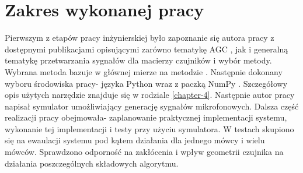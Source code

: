 \section{Zakres wykonanej pracy}
Pierwszym z etapów pracy inżynierskiej było zapoznanie się autora pracy z dostępnymi publikacjami opisującymi zarówno tematykę AGC \cite{Braun2014}, \cite{Archibald2008} jak i generalną tematykę przetwarzania sygnałów dla macierzy czujników \cite{Benesty2008} i wybór metody. Wybrana metoda bazuje w głównej mierze na metodzie \cite{Braun2014}.
Następnie dokonany wyboru środowiska pracy- języka Python wraz z paczką NumPy \cite{numpy}. Szczegółowy opis użytych narzędzie znajduje się w rodziale \ref{chapter-4}. Następnie autor pracy napisał symulator umożliwiający generację sygnałów mikrofonowych. Dalsza część realizacji pracy obejmowała- zaplanowanie praktycznej implementacji systemu, wykonanie tej implementacji i testy przy użyciu symulatora. W testach skupiono się na ewaulacji systemu pod kątem działania dla jednego mówcy i wielu mówców. Sprawdzono odporność na zakłócenia i wpływ geometrii czujnika na działania poszczególnych składowych algorytmu.

